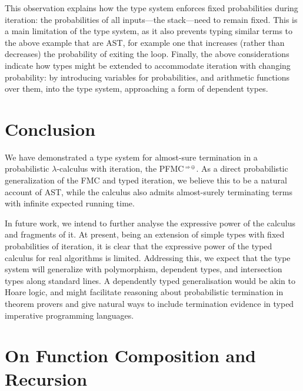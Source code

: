 \documentclass[a4paper,UKenglish,cleveref, autoref, thm-restate]{lipics-v2021}
\newcommand\PFMC{\textrm{PFMC}}
\newcommand\PFMCT{\PFMC$^{\,\smallbin{\Rightarrow\oplus}}$}
\begin{document}
This observation explains how the type system enforces fixed probabilities during iteration: the probabilities of all inputs---the stack---need to remain fixed. This is a main limitation of the type system, as it also prevents typing similar terms to the above example that are AST, for example one that increases (rather than decreases) the probability of exiting the loop. Finally, the above considerations indicate how types might be extended to accommodate iteration with changing probability: by introducing variables for probabilities, and arithmetic functions over them, into the type system, approaching a form of dependent types.



\section{Conclusion}

We have demonstrated a type system for almost-sure termination in a probabilistic $\lambda$-calculus with iteration, the \PFMCT. As a direct probabilistic generalization of the FMC and typed iteration, we believe this to be a natural account of AST, while the calculus also admits almost-surely terminating terms with infinite expected running time.

In future work, we intend to further analyse the expressive power of the calculus and fragments of it. At present, being an extension of simple types with fixed probabilities of iteration, it is clear that the expressive power of the typed calculus for real algorithms is limited. Addressing this, we expect that the type system will generalize with polymorphism, dependent types, and intersection types along standard lines. A dependently typed generalisation would be akin to Hoare logic, and might facilitate reasoning about probabilistic termination in theorem provers and give natural ways to include termination evidence in typed imperative programming languages.




\newpage

\appendix

\section{On Function Composition and Recursion}
\label{A:recursion}
\end{document}
